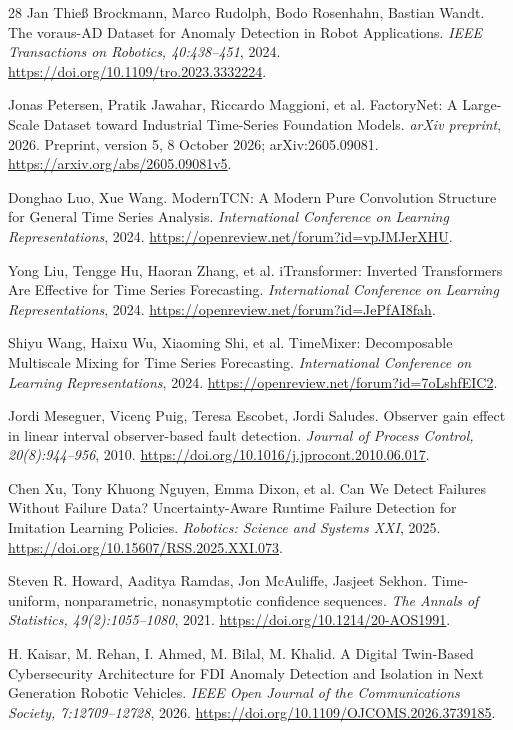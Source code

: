 \begin{thebibliography}{28}
 Jan Thieß Brockmann, Marco Rudolph, Bodo Rosenhahn, Bastian Wandt. {The voraus-AD Dataset for Anomaly Detection in Robot Applications}. \emph{IEEE Transactions on Robotics, 40:438--451}, 2024. \url{https://doi.org/10.1109/tro.2023.3332224}.

 Jonas Petersen, Pratik Jawahar, Riccardo Maggioni, et al. {FactoryNet: A Large-Scale Dataset toward Industrial Time-Series Foundation Models}. \emph{arXiv preprint}, 2026. Preprint, version 5, 8 October 2026; arXiv:2605.09081. \url{https://arxiv.org/abs/2605.09081v5}.

 Donghao Luo, Xue Wang. {ModernTCN: A Modern Pure Convolution Structure for General Time Series Analysis}. \emph{International Conference on Learning Representations}, 2024. \url{https://openreview.net/forum?id=vpJMJerXHU}.

 Yong Liu, Tengge Hu, Haoran Zhang, et al. {iTransformer: Inverted Transformers Are Effective for Time Series Forecasting}. \emph{International Conference on Learning Representations}, 2024. \url{https://openreview.net/forum?id=JePfAI8fah}.

 Shiyu Wang, Haixu Wu, Xiaoming Shi, et al. {TimeMixer: Decomposable Multiscale Mixing for Time Series Forecasting}. \emph{International Conference on Learning Representations}, 2024. \url{https://openreview.net/forum?id=7oLshfEIC2}.

 Jordi Meseguer, Vicen{\c c} Puig, Teresa Escobet, Jordi Saludes. {Observer gain effect in linear interval observer-based fault detection}. \emph{Journal of Process Control, 20(8):944--956}, 2010. \url{https://doi.org/10.1016/j.jprocont.2010.06.017}.

 Chen Xu, Tony Khuong Nguyen, Emma Dixon, et al. {Can We Detect Failures Without Failure Data? Uncertainty-Aware Runtime Failure Detection for Imitation Learning Policies}. \emph{Robotics: Science and Systems XXI}, 2025. \url{https://doi.org/10.15607/RSS.2025.XXI.073}.

 Steven R. Howard, Aaditya Ramdas, Jon McAuliffe, Jasjeet Sekhon. {Time-uniform, nonparametric, nonasymptotic confidence sequences}. \emph{The Annals of Statistics, 49(2):1055--1080}, 2021. \url{https://doi.org/10.1214/20-AOS1991}.

 H. Kaisar, M. Rehan, I. Ahmed, M. Bilal, M. Khalid. {A Digital Twin-Based Cybersecurity Architecture for FDI Anomaly Detection and Isolation in Next Generation Robotic Vehicles}. \emph{IEEE Open Journal of the Communications Society, 7:12709--12728}, 2026. \url{https://doi.org/10.1109/OJCOMS.2026.3739185}.


\end{thebibliography}

